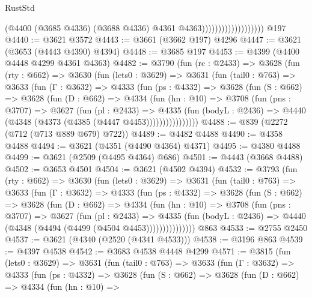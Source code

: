 \begin{lexlean}{RustStd}
\begin{coremodule}
                                        (@4400
                                          (@3685 @4336)
                                          (@3688 @4336)
                                          @4361
                                          @4363)))))))))))))))))))
    @197
@4440 := @3621 @3572
@4443 := @3661 (@3662 @197) @4296
@4447 := @3621 (@3653 (@4443 @4390) @4394)
@4448 := @3685 @197
@4453 := @4399 (@4400 @4448 @4299 @4361 @4363)
@4482 := @3790
    (fun (rc : @2433) =>
    @3628
      (fun (rty : @662) =>
      @3630
        (fun (lets0 : @3629) =>
        @3631
          (fun (tail0 : @763) =>
          @3633
            (fun (Γ : @3632) =>
            @4333
              (fun (ps : @4332) =>
              @3628
                (fun (S : @662) =>
                @3628
                  (fun (D : @662) =>
                  @4334
                    (fun (hn : @10) =>
                    @3708
                      (fun (pns : @3707) =>
                      @3627
                        (fun (pl : @2433) =>
                        @4335
                          (fun (bodyL : @2436) =>
                          @4440 (@4348 (@4373 (@4385 (@4447 @4453))))))))))))))))
@4488 := @839 (@2272 (@712 (@713 @889 @679) @722))
@4489 := @4482 @4488
@4490 := @4358 @4488
@4494 := @3621 (@4351 (@4490 @4364) @4371)
@4495 := @4380 @4488
@4499 := @3621 (@2509 (@4495 @4364) @686)
@4501 := @4443 (@3668 @4488)
@4502 := @3653 @4501
@4504 := @3621 (@4502 @4394)
@4532 := @3793
    (fun (rty : @662) =>
    @3630
      (fun (lets0 : @3629) =>
      @3631
        (fun (tail0 : @763) =>
        @3633
          (fun (Γ : @3632) =>
          @4333
            (fun (ps : @4332) =>
            @3628
              (fun (S : @662) =>
              @3628
                (fun (D : @662) =>
                @4334
                  (fun (hn : @10) =>
                  @3708
                    (fun (pns : @3707) =>
                    @3627
                      (fun (pl : @2433) =>
                      @4335
                        (fun (bodyL : @2436) =>
                        @4440 (@4348 (@4494 (@4499 (@4504 @4453)))))))))))))))
    @863
@4533 := @2755 @2450
@4537 := @3621 (@4340 (@2520 (@4341 @4533)))
@4538 := @3196 @863
@4539 := @4397 @4538
@4542 := @3683 @4538 @4448 @4299
@4571 := @3815
    (fun (lets0 : @3629) =>
    @3631
      (fun (tail0 : @763) =>
      @3633
        (fun (Γ : @3632) =>
        @4333
          (fun (ps : @4332) =>
          @3628
            (fun (S : @662) =>
            @3628
              (fun (D : @662) =>
              @4334
                (fun (hn : @10) =>

\end{coremodule}
\end{lexlean}
